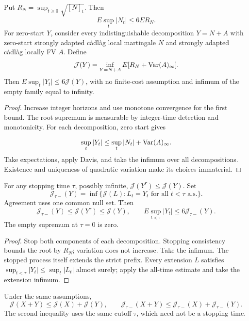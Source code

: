 \begin{lemma}
Put $R_N=\sup_{t\geq0}\sqrt{[N]_t}$. Then
\[
 E\sup_t|N_t|\leq6ER_N.
\]
For zero-start $Y$, consider every indistinguishable decomposition $Y=N+A$
with zero-start strongly adapted c\`adl\`ag local martingale $N$ and
strongly adapted c\`adl\`ag locally FV $A$. Define
\[
 \mathcal J(Y)=\inf_{Y=N+A}E[R_N+\operatorname{Var}(A)_\infty].
\]
Then $E\sup_t|Y_t|\leq6\mathcal J(Y)$, with no finite-cost assumption and
infimum of the empty family equal to infinity.
\end{lemma}
\begin{proof}
Increase integer horizons and use monotone convergence for the first bound.
The root supremum is measurable by integer-time detection and monotonicity.
For each decomposition, zero start gives

\[
 \sup_t|Y_t|\leq\sup_t|N_t|+\operatorname{Var}(A)_\infty.
\]
Take expectations, apply Davis, and take the infimum over all decompositions.
Existence and uniqueness of quadratic variation make its choices immaterial.
\end{proof}
\begin{lemma}
For any stopping time $\tau$, possibly infinite, $\mathcal J(Y^\tau)\leq\mathcal J(Y)$.
Set
\[
 \mathcal J_{\tau-}(Y)=\inf\{\mathcal J(L): L_t=Y_t\text{ for all }t<\tau\text{ a.s.}\}.
\]
Agreement uses one common null set. Then
\[
 \mathcal J_{\tau-}(Y)\leq\mathcal J(Y^\tau)\leq\mathcal J(Y),\qquad
 E\sup_{t<\tau}|Y_t|\leq6\mathcal J_{\tau-}(Y).
\]
The empty supremum at $\tau=0$ is zero.
\end{lemma}
\begin{proof}
Stop both components of each decomposition. Stopping consistency bounds the
root by $R_N$; variation does not increase. Take the infimum.
The stopped process itself extends the strict prefix. Every extension $L$
satisfies $\sup_{t<\tau}|Y_t|\leq\sup_t|L_t|$ almost surely; apply the
all-time estimate and take the extension infimum.
\end{proof}
\begin{lemma}
Under the same assumptions,
\[
 \mathcal J(X+Y)\leq\mathcal J(X)+\mathcal J(Y),\qquad
 \mathcal J_{\tau-}(X+Y)\leq\mathcal J_{\tau-}(X)+\mathcal J_{\tau-}(Y).
\]
The second inequality uses the same cutoff $\tau$, which need not be a
stopping time.
\end{lemma}
